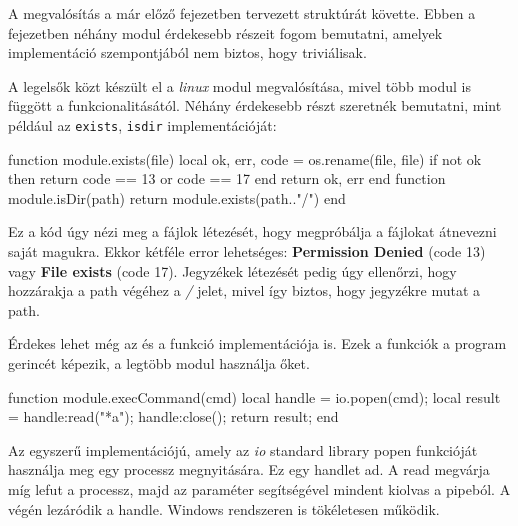
A megvalósítás a már előző fejezetben tervezett struktúrát követte. Ebben a fejezetben néhány modul érdekesebb részeit fogom bemutatni, amelyek implementáció szempontjából nem biztos, hogy triviálisak.


A legelsők közt készült el a \textit{linux} modul megvalósítása, mivel több modul is függött a funkcionalitásától. Néhány érdekesebb részt szeretnék bemutatni, mint például az \texttt{exists}, \texttt{isdir} implementációját:

\begin{lua}
function module.exists(file)
    local ok, err, code = os.rename(file, file)
    if not ok then
		return code == 13 or code == 17
    end
    return ok, err
end
function module.isDir(path)
    return module.exists(path.."/")
end
\end{lua}

Ez a kód úgy nézi meg a fájlok létezését, hogy megpróbálja a fájlokat átnevezni saját magukra. Ekkor kétféle error lehetséges: \textbf{Permission Denied} (code 13) vagy \textbf{File exists} (code 17). Jegyzékek létezését pedig úgy ellenőrzi, hogy hozzárakja a path végéhez a \textit{/} jelet, mivel így biztos, hogy jegyzékre mutat a path.

Érdekes lehet még az \texttt{} és a \texttt{} funkció implementációja is. Ezek a funkciók a program gerincét képezik, a legtöbb modul használja őket.

\begin{lua}
function module.execCommand(cmd)
    local handle = io.popen(cmd);
    local result = handle:read("*a");
    handle:close();
    return result;
end
\end{lua}

Az \texttt{} egyszerű implementációjú, amely az \textit{io} standard library popen funkcióját használja meg egy processz megnyitására. Ez egy handlet ad. A read megvárja míg lefut a processz, majd az \textit{} paraméter segítségével mindent kiolvas a pipeból. A végén lezáródik a handle. Windows rendszeren is tökéletesen működik.

